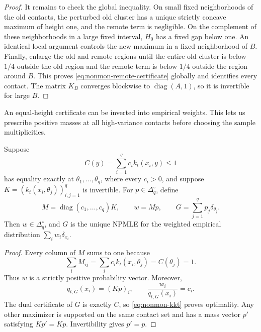 \begin{proof}
It remains to check the global inequality. On small fixed neighborhoods of
the old contacts, the perturbed old cluster has a unique strictly concave
maximum of height one, and the remote term is negligible. On the complement
of these neighborhoods in a large fixed interval, \(H_0\) has a fixed gap
below one. An identical local argument controls the new maximum in a fixed
neighborhood of \(B\). Finally, enlarge the old and remote regions until the
entire old cluster is below \(1/4\) outside the old region and the remote
term is below \(1/4\) outside the region around \(B\). This proves
\eqref{eq:nonmon-remote-certificate} globally and identifies every contact.
The matrix \(K_B\) converges blockwise to
\(\operatorname{diag}(A,1)\), so it is invertible for large \(B\).
\end{proof}

An equal-height certificate can be inverted into empirical weights. This
lets us prescribe positive masses at all high-variance contacts before
choosing the sample multiplicities.
\begin{lemma}
\label{lem:nonmon-inverse-kkt}
Suppose
\[
    C(y)=\sum_{i=1}^q c_i k_t(x_i,y)\le1
\]
has equality exactly at \(\theta_1,\ldots,\theta_q\), where every \(c_i>0\),
and suppose \(K=(k_t(x_i,\theta_j))_{i,j=1}^q\) is invertible. For
\(p\in\Delta_q^\circ\), define
\[
    M=\operatorname{diag}(c_1,\ldots,c_q)K,
    \qquad
    w=Mp,
    \qquad
    G=\sum_{j=1}^q p_j\delta_{\theta_j}.
\]
Then \(w\in\Delta_q^\circ\), and \(G\) is the unique NPMLE for the weighted
empirical distribution \(\sum_iw_i\delta_{x_i}\).
\end{lemma}

\begin{proof}
Every column of \(M\) sums to one because
\[
    \sum_iM_{ij}
    =\sum_ic_i k_t(x_i,\theta_j)
    =C(\theta_j)=1.
\]
Thus \(w\) is a strictly positive probability vector. Moreover,
\[
    q_{t,G}(x_i)=(Kp)_i,
    \qquad
    \frac{w_i}{q_{t,G}(x_i)}=c_i.
\]
The dual certificate of \(G\) is exactly \(C\), so
\eqref{eq:nonmon-kkt} proves optimality. Any other maximizer is supported on
the same contact set and has a mass vector \(p'\) satisfying \(Kp'=Kp\).
Invertibility gives \(p'=p\).
\end{proof}

